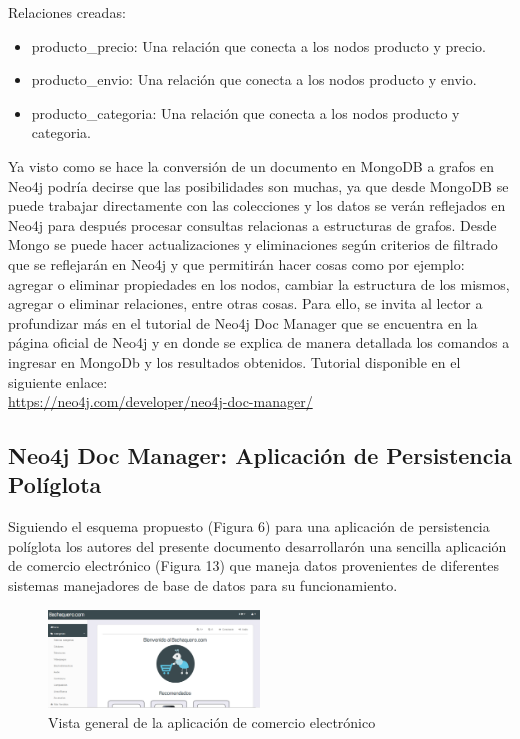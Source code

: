 \documentclass[conference]{IEEEtran}
\begin{document}
Relaciones creadas:\\

\begin{itemize}
\item producto\_precio: Una relaci\'on que conecta a los nodos producto y precio.
\item producto\_envio: Una relaci\'on que conecta a los nodos producto y envio.
\item producto\_categoria: Una relaci\'on que conecta a los nodos producto y categoria.\\
\end{itemize}

Ya visto como se hace la conversi\'on de un documento en MongoDB a grafos en Neo4j podr\'ia decirse que las posibilidades son muchas, ya que desde MongoDB se puede trabajar directamente con las colecciones y los datos se ver\'an reflejados en Neo4j para despu\'es procesar consultas relacionas a estructuras de grafos. Desde Mongo se puede hacer actualizaciones y eliminaciones  seg\'un criterios de filtrado que se reflejar\'an en Neo4j y que permitir\'an hacer cosas como por ejemplo: agregar o eliminar propiedades en los nodos, cambiar la estructura de los mismos, agregar o eliminar relaciones, entre otras cosas. Para ello, se invita al lector a profundizar m\'as en el tutorial de Neo4j Doc Manager que se encuentra en la p\'agina oficial de Neo4j  y en donde se explica de manera detallada los comandos a ingresar en MongoDb y los resultados obtenidos. Tutorial disponible en el siguiente enlace:\\
\url{https://neo4j.com/developer/neo4j-doc-manager/}

\subsection*{Neo4j Doc Manager: Aplicaci\'on de Persistencia Pol\'iglota}

Siguiendo el esquema propuesto (Figura 6) para una aplicaci\'on de persistencia pol\'iglota  los autores del presente documento desarrollar\'on una sencilla aplicaci\'on de comercio electr\'onico (Figura 13) que maneja datos provenientes de diferentes sistemas manejadores de base de datos para su funcionamiento.

\begin{figure}[!h]
\centering
\includegraphics[width=0.5\textwidth]{13}
\caption{Vista general de la aplicaci\'on de comercio electr\'onico}
\label{}
\end{figure}
\end{document}
